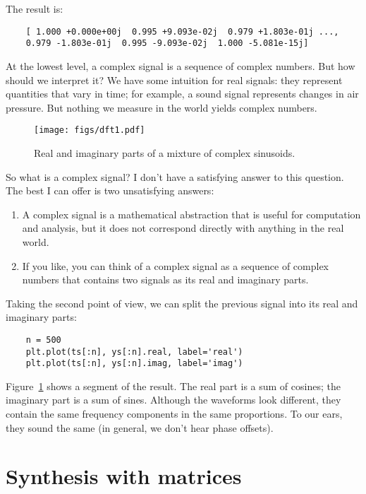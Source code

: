 The result is:

\begin{verbatim}
	[ 1.000 +0.000e+00j  0.995 +9.093e-02j  0.979 +1.803e-01j ...,
	0.979 -1.803e-01j  0.995 -9.093e-02j  1.000 -5.081e-15j]
\end{verbatim}

At the lowest level, a complex signal is a sequence of complex
numbers.  But how should we interpret it?  We have some intuition for
real signals: they represent quantities that vary in time; for
example, a sound signal represents changes in air pressure.
But nothing we measure in the world yields complex numbers.

\begin{figure}
	\centerline{\texttt{[image: figs/dft1.pdf]}}
	\caption{Real and imaginary parts of a mixture of complex sinusoids.}
	\label{fig.dft1}
\end{figure}

So what is a complex signal?  I don't have a satisfying answer to this
question.  The best I can offer is two unsatisfying
answers:

\begin{enumerate}
	
	\item A complex signal is a mathematical abstraction that is useful
	for computation and analysis, but it does not correspond directly
	with anything in the real world.
	
	\item If you like, you can think of a complex signal as a sequence of
	complex numbers that contains two signals as its real and imaginary
	parts.
	
\end{enumerate}

Taking the second point of view, we can split the previous
signal into its real and imaginary parts:

\begin{verbatim}
	n = 500
	plt.plot(ts[:n], ys[:n].real, label='real')
	plt.plot(ts[:n], ys[:n].imag, label='imag')
\end{verbatim}

Figure~\ref{fig.dft1} shows a segment of the result.  The
real part is a sum of cosines; the imaginary part is
a sum of sines.  Although the waveforms look different, they
contain the same frequency components in the same proportions.
To our ears, they sound the same (in general, we don't hear
phase offsets).


\section{Synthesis with matrices}
\label{synthmat}

